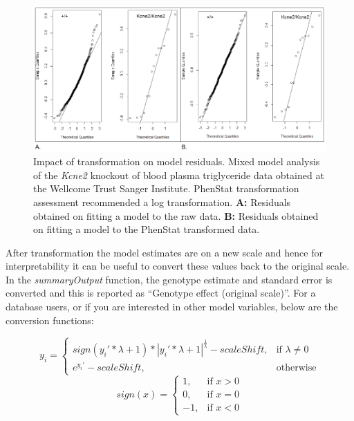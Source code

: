 \documentclass[12pt,a4paper]{article}
\begin{document}
\begin{figure}[!htpb]%
\centerline{\includegraphics[scale=0.5]{transformation_example.png}}
\caption{Impact of transformation on model residuals. Mixed model analysis of the \textit{Kcne2} knockout of blood plasma triglyceride data obtained at the Wellcome Trust Sanger Institute. PhenStat transformation assessment recommended a log transformation. \textbf{A:}  Residuals obtained on fitting a model to the raw data.  \textbf{B:}  Residuals obtained on fitting a model to the PhenStat transformed data. }\label{fig:tr1}
\end{figure}

After transformation the model estimates are on a new scale and hence for interpretability it can be useful to convert these values back to the original scale.  In the \textit{summaryOutput} function, the genotype estimate and standard error is converted and this is reported as “Genotype effect (original scale)”. 
For a database users, or if you are interested in other model variables, below are the conversion functions:

\begin{equation}
  y_i=\begin{cases}
    sign(y_i' * \lambda+1) * |y_i' * \lambda+1| ^\frac{1}{\lambda} - scaleShift, & \text{if $\lambda \neq 0$}\\
    e^{y_i'} - scaleShift, & \text{otherwise}
  \end{cases}
\end{equation}
\[
    sign(x)=\begin{cases}
    1, & \text{if $x > 0$}\\
    0, & \text{if $x = 0$}\\
    -1, & \text{if $x < 0$} 
  \end{cases}
\]
\end{document}
